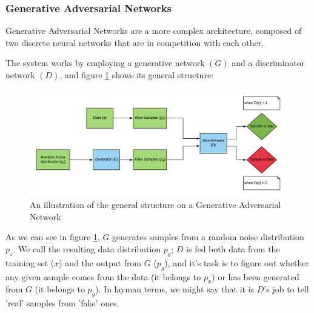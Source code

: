 

\subsubsection{Generative Adversarial Networks}\label{subsubsec:gans}
Generative Adversarial Networks are a more complex architecture, composed of two discrete neural networks that are in competition with each other.

The system works by employing a generative network $(G)$ and a discriminator network $(D)$, and figure \ref{fig:gan-diagram} shows its general structure:

\begin{figure}[H]
\centering
    \includegraphics[scale=0.60]{figures/GAN_v2.png}
    \caption{An illustration of the general structure on a Generative Adversarial Network}
    \label{fig:gan-diagram}
\end{figure}    

As we can see in figure \ref{fig:gan-diagram}, $G$ generates samples from a random noise distribution $p_z$. We call the resulting data distribution $p_g$; $D$ is fed both data from the training set ($x$) and the output from $G$ ($p_g$), and it's task is to figure out whether any given sample comes from the data (it belongs to $p_x$) or has been generated from $G$ (it belongs to $p_g$). In layman terms, we might say that it is $D$'s job to tell 'real' samples from 'fake' ones.

